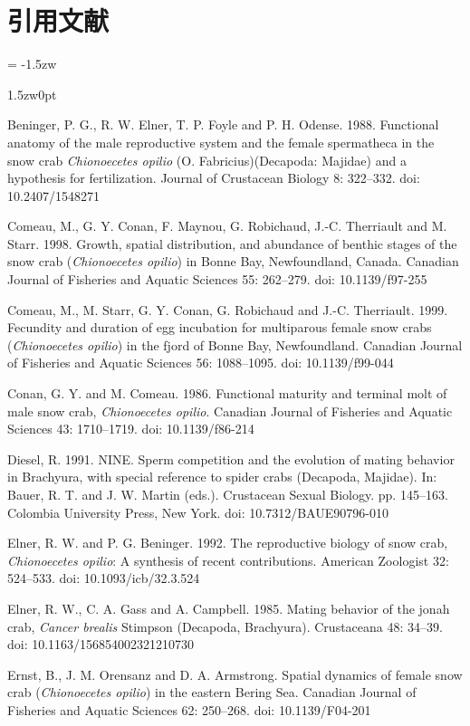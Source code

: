 \section*{引用文献}
\parindent = -1.5zw
\begin{indentation}{1.5zw}{0pt}

Beninger, P. G., R. W. Elner, T. P. Foyle and P. H. Odense. 1988. Functional anatomy of the male reproductive system and the female spermatheca in the snow crab \textit{Chionoecetes opilio} (O. Fabricius)(Decapoda: Majidae) and a hypothesis for fertilization. Journal of Crustacean Biology 8: 322--332. doi: 10.2407/1548271

Comeau, M., G. Y. Conan, F. Maynou, G. Robichaud, J.-C. Therriault and M. Starr. 1998. Growth, spatial distribution, and abundance of benthic stages of the snow crab (\textit{Chionoecetes opilio}) in Bonne Bay, Newfoundland, Canada. Canadian Journal of Fisheries and Aquatic Sciences 55: 262--279. doi: 10.1139/f97-255

Comeau, M., M. Starr, G. Y. Conan, G. Robichaud and J.-C. Therriault. 1999. Fecundity and duration of egg incubation for multiparous female snow crabs (\textit{Chionoecetes opilio}) in the fjord of Bonne Bay, Newfoundland. Canadian Journal of Fisheries and Aquatic Sciences 56: 1088--1095. doi: 10.1139/f99-044

Conan, G. Y. and M. Comeau. 1986. Functional maturity and terminal molt of male snow crab, \textit{Chionoecetes opilio}. Canadian Journal of Fisheries and Aquatic Sciences 43: 1710--1719. doi: 10.1139/f86-214

Diesel, R. 1991. NINE. Sperm competition and the evolution of mating behavior in Brachyura, with special reference to spider crabs (Decapoda, Majidae). In: Bauer, R. T. and J. W. Martin (eds.). Crustacean Sexual Biology. pp. 145--163. Colombia University Press, New York. doi: 10.7312/BAUE90796-010 

Elner, R. W. and P. G. Beninger. 1992. The reproductive biology of snow crab, \textit{Chionoecetes opilio}: A synthesis of recent contributions. American Zoologist 32: 524--533. doi: 10.1093/icb/32.3.524

Elner, R. W., C. A. Gass and A. Campbell. 1985. Mating behavior of the jonah crab, \textit{Cancer brealis} Stimpson (Decapoda, Brachyura). Crustaceana 48: 34--39. doi: 10.1163/156854002321210730

Ernst, B., J. M. Orensanz and D. A. Armstrong. Spatial dynamics of female snow crab (\textit{Chionoecetes opilio}) in the eastern Bering Sea. Canadian Journal of Fisheries and Aquatic Sciences 62: 250--268. doi: 10.1139/F04-201


\end{indentation}
